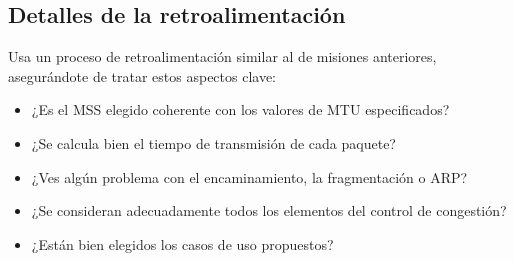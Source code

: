 \vspace{-0.25cm}

\subsection*{Detalles de la retroalimentación}

Usa un proceso de retroalimentación similar al de misiones anteriores, asegurándote de tratar estos aspectos clave:
\begin{itemize}
\item ¿Es el MSS elegido coherente con los valores de MTU especificados?
\item ¿Se calcula bien el tiempo de transmisión de cada paquete?
\item ¿Ves algún problema con el encaminamiento, la fragmentación o ARP?
\item ¿Se consideran adecuadamente todos los elementos del control de congestión?
\item ¿Están bien elegidos los casos de uso propuestos?
\end{itemize}

